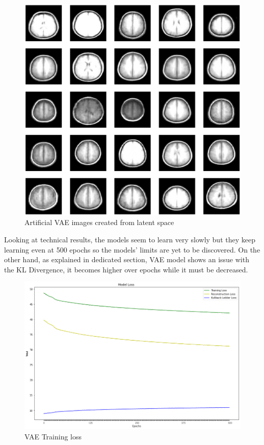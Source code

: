 \begin{figure}[ht]
    \centering
    \includegraphics[width = 17cm]{images/vae-brains-results-from-latent-space.png}
    \caption[Artificial VAE images created from latent space]{Artificial VAE images created from latent space}
    \label{fig:vae-images-from-latent-space}
\end{figure}

Looking at technical results, the models seem to learn very slowly but they keep learning even at 500 epochs so the models' limits are yet to be discovered. On the other hand, as explained in dedicated section, VAE model shows an issue with the KL Divergence, it becomes higher over epochs while it must be decreased.

\begin{figure}[ht]
    \includegraphics[width = 17cm]{images/vae-loss-results.png}
    \caption[VAE Training loss]{VAE Training loss}
    \label{fig:vae-training-loss}
\end{figure}

